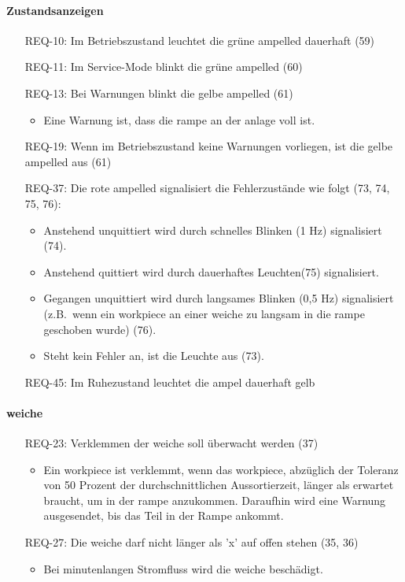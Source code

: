 \paragraph{Zustandsanzeigen}
\begin{itemize}
    \item[REQ-10:] Im Betriebszustand leuchtet die grüne \gls{ampelled} dauerhaft (59)
    \item[REQ-11:] Im Service-Mode blinkt die grüne \gls{ampelled}  (60)
    \item[REQ-13:] Bei Warnungen blinkt die gelbe \gls{ampelled} (61)
    \begin{itemize}
        \item Eine Warnung ist, dass die \gls{rampe} an der \gls{anlage} voll ist.
    \end{itemize}
    \item[REQ-19:] Wenn im Betriebszustand keine Warnungen vorliegen, ist die gelbe \gls{ampelled} aus (61)
    \item[REQ-37:] Die rote \gls{ampelled} signalisiert die Fehlerzustände wie folgt (73, 74, 75, 76):
    \begin{itemize}
        \item Anstehend unquittiert wird durch schnelles Blinken (1 Hz) signalisiert (74).
        \item Anstehend quittiert wird durch dauerhaftes Leuchten(75) signalisiert.
        \item Gegangen unquittiert wird durch langsames Blinken (0,5 Hz) signalisiert (z.B.\ wenn ein
        \gls{workpiece} an einer \gls{weiche} zu langsam in die \gls{rampe} geschoben wurde) (76).
        \item Steht kein Fehler an, ist die Leuchte aus (73).
    \end{itemize}
    \item[REQ-45:] Im Ruhezustand leuchtet die \gls{ampel} dauerhaft gelb
\end{itemize}

\paragraph{\gls{weiche}}
\begin{itemize}
    \item[REQ-23:] Verklemmen der \gls{weiche} soll überwacht werden (37)
    \begin{itemize}
        \item Ein \gls{workpiece} ist verklemmt, wenn das \gls{workpiece}, abzüglich der Toleranz von 50 Prozent
        der durchschnittlichen Aussortierzeit, länger als erwartet braucht, um in der \gls{rampe} anzukommen.
        Daraufhin wird eine Warnung ausgesendet, bis das Teil in der Rampe ankommt.
    \end{itemize}
    \item[REQ-27:] Die \gls{weiche} darf nicht länger als 'x' auf offen stehen (35, 36)
    \begin{itemize}
        \item Bei minutenlangen Stromfluss wird die \gls{weiche} beschädigt.
    \end{itemize}
\end{itemize}

